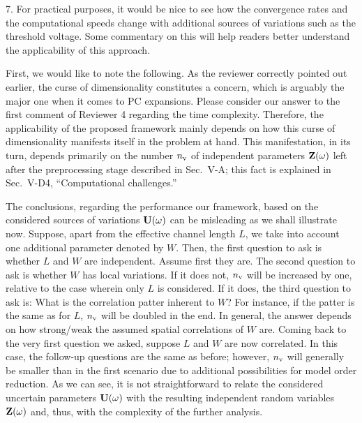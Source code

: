 \begin{reviewer}
7. For practical purposes, it would be nice to see how the convergence rates and the computational speeds change with additional sources of variations such as the threshold voltage. Some commentary on this will help readers better understand the applicability of this approach.
\end{reviewer}
\begin{authors}
First, we would like to note the following.
As the reviewer correctly pointed out earlier, the curse of dimensionality constitutes a concern, which is arguably the major one when it comes to PC expansions.
Please consider our answer to the first comment of Reviewer 4 regarding the time complexity.
Therefore, the applicability of the proposed framework mainly depends on how this curse of dimensionality manifests itself in the problem at hand.
This manifestation, in its turn, depends primarily on the number ${n_\text{v}}$ of independent parameters $\mathbf{Z}(\omega)$ left after the preprocessing stage described in Sec.~V-A; this fact is explained in Sec.~V-D4, ``Computational challenges.''

The conclusions, regarding the performance our framework, based on the considered sources of variations $\mathbf{U}(\omega)$ can be misleading as we shall illustrate now.
Suppose, apart from the effective channel length $L$, we take into account one additional parameter denoted by $W$.
Then, the first question to ask is whether $L$ and $W$ are independent.
Assume first they are.
The second question to ask is whether $W$ has local variations.
If it does not, ${n_\text{v}}$ will be increased by one, relative to the case wherein only $L$ is considered.
If it does, the third question to ask is: What is the correlation patter inherent to $W$?
For instance, if the patter is the same as for $L$, ${n_\text{v}}$ will be doubled in the end.
In general, the answer depends on how strong/weak the assumed spatial correlations of $W$ are.
Coming back to the very first question we asked, suppose $L$ and $W$ are now correlated.
In this case, the follow-up questions are the same as before; however, ${n_\text{v}}$ will generally be smaller than in the first scenario due to additional possibilities for model order reduction.
As we can see, it is not straightforward to relate the considered uncertain parameters $\mathbf{U}(\omega)$ with the resulting independent random variables $\mathbf{Z}(\omega)$ and, thus, with the complexity of the further analysis.


\end{authors}
